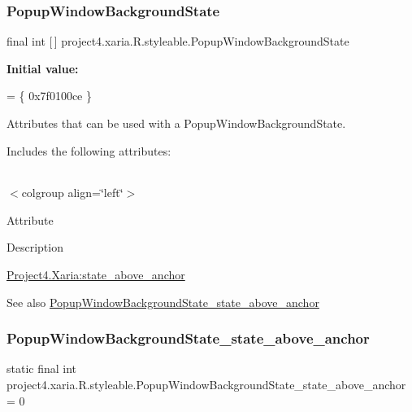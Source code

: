 \subsubsection{\texorpdfstring{Popup\+Window\+Background\+State}{PopupWindowBackgroundState}}
{\footnotesize\ttfamily final int \mbox{[}$\,$\mbox{]} project4.\+xaria.\+R.\+styleable.\+Popup\+Window\+Background\+State\hspace{0.3cm}{\ttfamily [static]}}

{\bfseries Initial value\+:}
\begin{DoxyCode}
= \{
            0x7f0100ce
        \}
\end{DoxyCode}
Attributes that can be used with a Popup\+Window\+Background\+State. 

Includes the following attributes\+:

\tabulinesep=1mm
\begin{longtabu} spread 0pt [c]{*{0}{|X[-1]}|}
\hline
\end{longtabu}
$<$colgroup align=\char`\"{}left\char`\"{}$>$ 

Attribute

Description 

{\ttfamily \hyperlink{classproject4_1_1xaria_1_1R_1_1styleable_a2a8ab4a40132dc965599968290b3b84d}{Project4.\+Xaria\+:state\+\_\+above\+\_\+anchor}}

\begin{DoxySeeAlso}{See also}
\hyperlink{classproject4_1_1xaria_1_1R_1_1styleable_a2a8ab4a40132dc965599968290b3b84d}{Popup\+Window\+Background\+State\+\_\+state\+\_\+above\+\_\+anchor} 
\end{DoxySeeAlso}
\mbox{\label{classproject4_1_1xaria_1_1R_1_1styleable_a2a8ab4a40132dc965599968290b3b84d}} 
\subsubsection{\texorpdfstring{Popup\+Window\+Background\+State\+\_\+state\+\_\+above\+\_\+anchor}{PopupWindowBackgroundState\_state\_above\_anchor}}
{\footnotesize\ttfamily static final int project4.\+xaria.\+R.\+styleable.\+Popup\+Window\+Background\+State\+\_\+state\+\_\+above\+\_\+anchor = 0\hspace{0.3cm}{\ttfamily [static]}}

